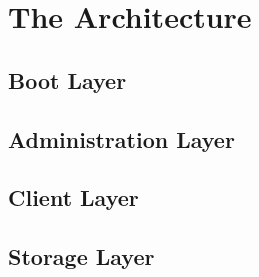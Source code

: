 \section{The Architecture} %
\label{sec:icbd_architecture}


\subsection{Boot Layer}
\label{sub:icbd_architecture_boot}


\subsection{Administration Layer}
\label{sub:icbd_architecture_adm}


\subsection{Client Layer}
\label{sub:icbd_architecture_client}

\subsection{Storage Layer}
\label{sub:icbd_architecture_storage}





 
